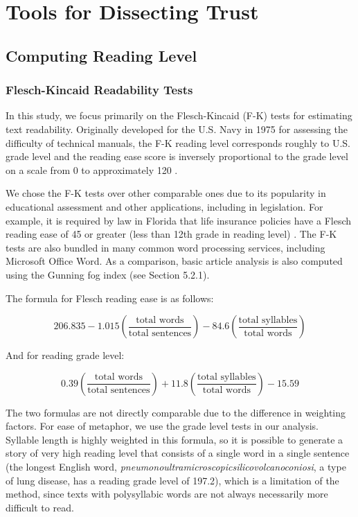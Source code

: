 \chapter{Tools for Dissecting Trust}

\section{Computing Reading Level}
\subsection{Flesch-Kincaid Readability Tests} 
In this study, we focus primarily on the Flesch-Kincaid (F-K) tests for estimating text readability. Originally developed for the U.S. Navy in 1975 for assessing the difficulty of technical manuals, the F-K reading level corresponds roughly to U.S. grade level and the reading ease score is inversely proportional to the grade level on a scale from 0 to approximately 120 \cite{kincaid1975derivation}.

We chose the F-K tests over other comparable ones due to its popularity in educational assessment and other applications, including in legislation. For example, it is required by law in Florida that life insurance policies have a Flesch reading ease of 45 or greater (less than 12th grade in reading level) \cite{Statu37online}. The F-K tests are also bundled in many common word processing services, including Microsoft Office Word. As a comparison, basic article analysis is also computed using the Gunning fog index (see Section 5.2.1).

The formula for Flesch reading ease is as follows:

$$206.835 - 1.015 \left( \frac{\mbox{total words}}{\mbox{total sentences}} \right) - 84.6 \left( \frac{\mbox{total syllables}}{\mbox{total words}} \right)$$

And for reading grade level:

$$0.39 \left ( \frac{\mbox{total words}}{\mbox{total sentences}} \right ) + 11.8 \left ( \frac{\mbox{total syllables}}{\mbox{total words}} \right ) - 15.59$$
 
The two formulas are not directly comparable due to the difference in weighting factors. For ease of metaphor, we use the grade level tests in our analysis. Syllable length is highly weighted in this formula, so it is possible to generate a story of very high reading level that consists of a single word in a single sentence (the longest English word, \emph{pneumonoultramicroscopicsilicovolcanoconiosi}, a type of lung disease, has a reading grade level of 197.2), which is a limitation of the method, since texts with polysyllabic words are not always necessarily more difficult to read.

